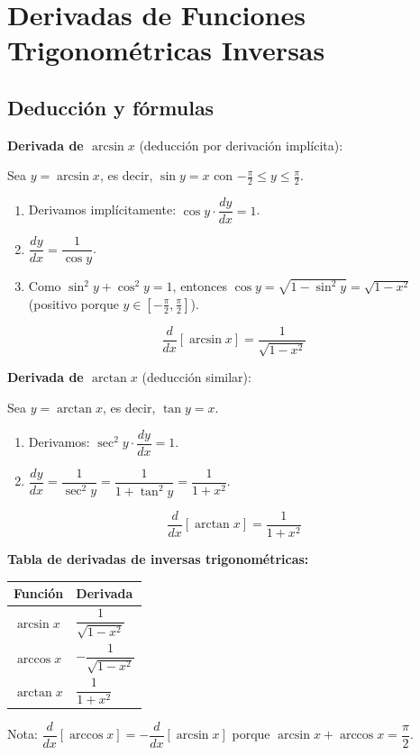 \documentclass[12pt, a4paper]{article}
\begin{document}
\newpage

\section{Derivadas de Funciones Trigonométricas Inversas}

\subsection{Deducción y fórmulas}

\begin{cuadroteoria}
  \textbf{Derivada de $\arcsin x$} (deducción por derivación implícita):

  Sea $y = \arcsin x$, es decir, $\sin y = x$ con $-\frac{\pi}{2} \leq y \leq \frac{\pi}{2}$.
  \begin{enumerate}[leftmargin=*]
    \item Derivamos implícitamente: $\cos y \cdot \dfrac{dy}{dx} = 1$.
    \item $\dfrac{dy}{dx} = \dfrac{1}{\cos y}$.
    \item Como $\sin^2 y + \cos^2 y = 1$, entonces $\cos y = \sqrt{1 - \sin^2 y} = \sqrt{1 - x^2}$ (positivo porque $y \in [-\frac{\pi}{2}, \frac{\pi}{2}]$).
  \end{enumerate}
  $$\boxed{\frac{d}{dx}[\arcsin x] = \frac{1}{\sqrt{1 - x^2}}}$$

  \textbf{Derivada de $\arctan x$} (deducción similar):

  Sea $y = \arctan x$, es decir, $\tan y = x$.
  \begin{enumerate}[leftmargin=*]
    \item Derivamos: $\sec^2 y \cdot \dfrac{dy}{dx} = 1$.
    \item $\dfrac{dy}{dx} = \dfrac{1}{\sec^2 y} = \dfrac{1}{1 + \tan^2 y} = \dfrac{1}{1 + x^2}$.
  \end{enumerate}
  $$\boxed{\frac{d}{dx}[\arctan x] = \frac{1}{1 + x^2}}$$
\end{cuadroteoria}

\begin{cuadrosolucion}
  \textbf{Tabla de derivadas de inversas trigonométricas:}
  \begin{center}
    \begin{tabular}{ll}
      \toprule
      \textbf{Función} & \textbf{Derivada}            \\
      \midrule
      $\arcsin x$      & $\dfrac{1}{\sqrt{1 - x^2}}$  \\
      $\arccos x$      & $-\dfrac{1}{\sqrt{1 - x^2}}$ \\
      $\arctan x$      & $\dfrac{1}{1 + x^2}$         \\
      \bottomrule
    \end{tabular}
  \end{center}
  Nota: $\dfrac{d}{dx}[\arccos x] = -\dfrac{d}{dx}[\arcsin x]$ porque $\arcsin x + \arccos x = \dfrac{\pi}{2}$.
\end{cuadrosolucion}
\end{document}
